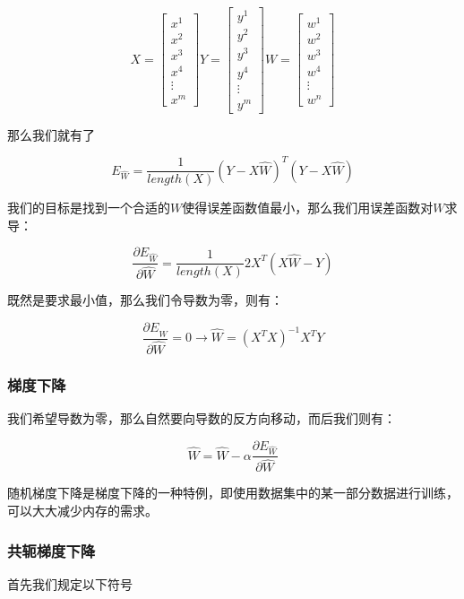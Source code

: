 \documentclass{ML}
\begin{document}
\[X = \begin{bmatrix}
		x^1 \\ x^2 \\ x^3 \\ x^4 \\ \vdots \\  x^m
	\end{bmatrix}
	Y = \begin{bmatrix}
		y^1 \\ y^2 \\ y^3 \\ y^4 \\ \vdots \\  y^m
	\end{bmatrix}
	W = \begin{bmatrix}
		w^1 \\ w^2 \\ w^3 \\ w^4 \\ \vdots \\  w^n
	\end{bmatrix}\]

那么我们就有了

\[E_{\hat{W}} = \frac{1}{length(X)} (Y - X \hat{W})^T(Y - X \hat{W})\]

我们的目标是找到一个合适的\(W\)使得误差函数值最小，那么我们用误差函数对\(W\)求导：

\[\frac{∂E_{\hat{W}}}{∂\hat{W}} = \frac{1}{length(X)} 2X^T(X\hat{W} - Y)\]

既然是要求最小值，那么我们令导数为零，则有：

\[\frac{∂E_{\hat{W}}}{∂\hat{W}} = 0 → \hat{W} = (X^TX)^{-1}X^TY\]

\subsubsection{梯度下降}

我们希望导数为零，那么自然要向导数的反方向移动，而后我们则有：

\[\hat{W} = \hat{W} - \alpha\frac{∂E_{\hat{W}}}{∂\hat{W}}\]

随机梯度下降是梯度下降的一种特例，即使用数据集中的某一部分数据进行训练，可以大大减少内存的需求。

\subsubsection{共轭梯度下降}

首先我们规定以下符号
\end{document}
